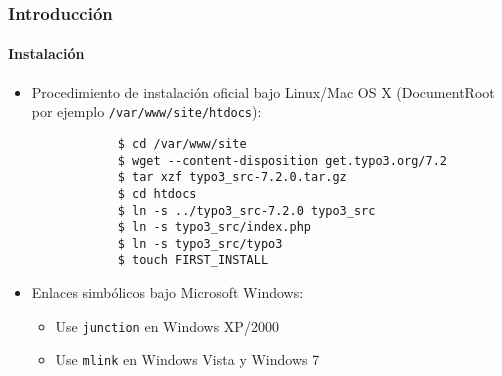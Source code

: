 \begin{frame}[fragile]
	\frametitle{Introducción}
	\framesubtitle{Instalación}

	\begin{itemize}
		\item Procedimiento de instalación oficial bajo Linux/Mac OS X\newline
			(DocumentRoot por ejemplo \texttt{/var/www/site/htdocs}):
		\begin{lstlisting}
			$ cd /var/www/site
			$ wget --content-disposition get.typo3.org/7.2
			$ tar xzf typo3_src-7.2.0.tar.gz
			$ cd htdocs
			$ ln -s ../typo3_src-7.2.0 typo3_src
			$ ln -s typo3_src/index.php
			$ ln -s typo3_src/typo3
			$ touch FIRST_INSTALL
		\end{lstlisting}

		\item Enlaces simbólicos bajo Microsoft Windows:

			\begin{itemize}
				\item Use \texttt{junction} en Windows XP/2000
				\item Use \texttt{mlink} en Windows Vista y Windows 7
			\end{itemize}

	\end{itemize}
\end{frame}


